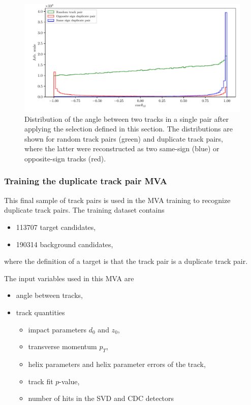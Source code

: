 \begin{figure}[H]
	\centering
	\captionsetup{width=0.8\linewidth}
	\includegraphics[width=\linewidth]{fig/ROECleanup_dup_angle_final}
	\caption{Distribution of the angle between two tracks in a single pair after applying the selection defined in this section. The distributions are shown for random track pairs (green) and duplicate track pairs, where the latter were reconstructed as two same-sign (blue) or opposite-sign tracks (red).}
	\label{fig:ROE_dupAngleFinal}
\end{figure}

\subsubsection{Training the duplicate track pair MVA}
\label{ss:trackMVA}

This final sample of track pairs is used in the MVA training to recognize duplicate track pairs. The training dataset contains
\begin{itemize}
	\item 113707 target candidates,
	\item 190314 background candidates,
\end{itemize}
where the definition of a target is that the track pair is a duplicate track pair. 

The input variables used in this MVA are
\begin{itemize}
	\item angle between tracks,
	\item track quantities
	\begin{itemize}
		\item impact parameters $d_0$ and $z_0$,
		\item transverse momentum $p_T$,
		\item helix parameters and helix parameter errors of the track,
		\item track fit $p$-value,
		\item number of hits in the SVD and CDC detectors
	\end{itemize}
\end{itemize}

